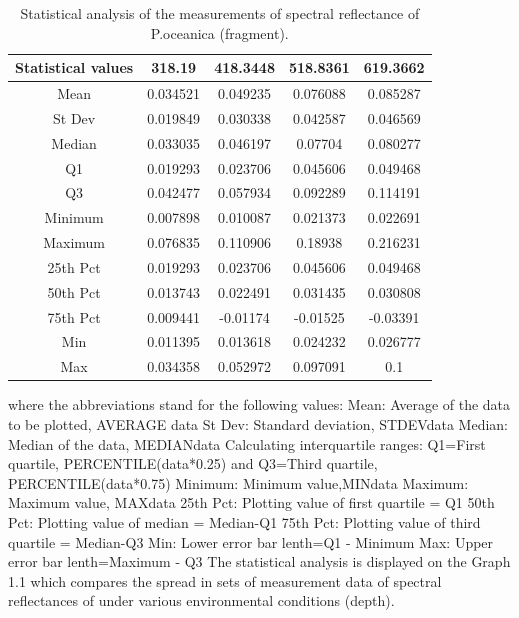 \documentclass[10pt, a4paper]{article}
\begin{document}
\begin{table}
\caption{Statistical analysis of the measurements of spectral reflectance of P.oceanica (fragment).}
\centering
  \begin{tabular}{| c | c | c | c | c |}
    \hline
    \textbf{Statistical values} & \textbf{318.19} & \textbf{418.3448} & \textbf{518.8361} & \textbf{619.3662} \\ \hline \hline
    Mean & 0.034521 & 0.049235 & 0.076088 & 0.085287 \\ \hline
    St Dev & 0.019849 & 0.030338 & 0.042587 & 0.046569 \\ \hline
   Median & 0.033035 & 0.046197 & 0.07704 & 0.080277 \\ \hline
   Q1 & 0.019293 & 0.023706 & 0.045606& 0.049468 \\ \hline
   Q3 & 0.042477 & 0.057934 & 0.092289 & 0.114191 \\ \hline
   Minimum & 0.007898 & 0.010087 & 0.021373 & 0.022691 \\ \hline
   Maximum & 0.076835 & 0.110906 & 0.18938 & 0.216231 \\ \hline
   25th Pct & 0.019293 & 0.023706 & 0.045606 & 0.049468 \\ \hline
   50th Pct & 0.013743 & 0.022491 & 0.031435 & 0.030808 \\ \hline
   75th Pct & 0.009441 & -0.01174 & -0.01525 & -0.03391 \\ \hline
   Min & 0.011395 & 0.013618 & 0.024232 & 0.026777 \\ \hline
   Max & 0.034358 & 0.052972 & 0.097091 & 0.1 \\ \hline
  \end{tabular}
   \label{tab:4}
\end{table}

where the abbreviations stand for the following values:
Mean: Average of the data to be plotted, AVERAGE {data}
St Dev: Standard deviation, STDEV{data}
Median: Median of the data, MEDIAN{data}
Calculating interquartile ranges: Q1=First quartile, PERCENTILE({data}*0.25) and Q3=Third
quartile, PERCENTILE({data}*0.75)
Minimum: Minimum value,MIN{data}
Maximum: Maximum value, MAX{data}
25th Pct: Plotting value of first quartile = Q1
50th Pct: Plotting value of median = Median-Q1
75th Pct: Plotting value of third quartile = Median-Q3
Min: Lower error bar lenth=Q1 - Minimum
Max: Upper error bar lenth=Maximum - Q3
The statistical analysis is displayed on the Graph 1.1 which compares the spread in sets of
measurement data of spectral reflectances of under various environmental conditions (depth).
\end{document}
